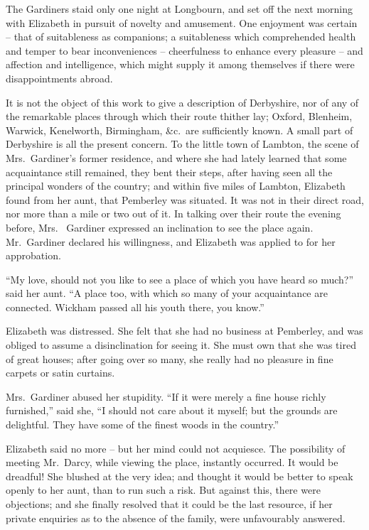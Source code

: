 The Gardiners staid only one night at Longbourn, and set
off the next morning with Elizabeth in pursuit of novelty
and amusement. One enjoyment was certain -- that of
suitableness as companions; a suitableness which
comprehended health and temper to bear inconveniences --
cheerfulness to enhance every pleasure -- and affection and
intelligence, which might supply it among themselves if
there were disappointments abroad.

It is not the object of this work to give a description
of Derbyshire, nor of any of the remarkable places through
which their route thither lay; Oxford, Blenheim, Warwick,
Kenelworth, Birmingham, \&c.\ are sufficiently known.
A small part of Derbyshire is all the present concern.
To the little town of Lambton, the scene of Mrs.\ Gardiner’s
former residence, and where she had lately learned that
some acquaintance still remained, they bent their steps,
after having seen all the principal wonders of the country;
and within five miles of Lambton, Elizabeth found from
her aunt, that Pemberley was situated. It was not in
their direct road, nor more than a mile or two out of it.
In talking over their route the evening before, Mrs.\ %
Gardiner expressed an inclination to see the place again.
Mr.\ Gardiner declared his willingness, and Elizabeth was
applied to for her approbation.

“My love, should not you like to see a place of which
you have heard so much?” said her aunt. “A place too,
with which so many of your acquaintance are connected.
Wickham passed all his youth there, you know.”

Elizabeth was distressed. She felt that she had no
business at Pemberley, and was obliged to assume a disinclination
for seeing it. She must own that she was tired
of great houses; after going over so many, she really had
no pleasure in fine carpets or satin curtains.

Mrs.\ Gardiner abused her stupidity. “If it were merely
a fine house richly furnished,” said she, “I should not
care about it myself; but the grounds are delightful.
They have some of the finest woods in the country.”

Elizabeth said no more -- but her mind could not
acquiesce. The possibility of meeting Mr.\ Darcy, while
viewing the place, instantly occurred. It would be
dreadful! She blushed at the very idea; and thought
it would be better to speak openly to her aunt, than to
run such a risk. But against this, there were objections;
and she finally resolved that it could be the last resource,
if her private enquiries as to the absence of the family,
were unfavourably answered.

